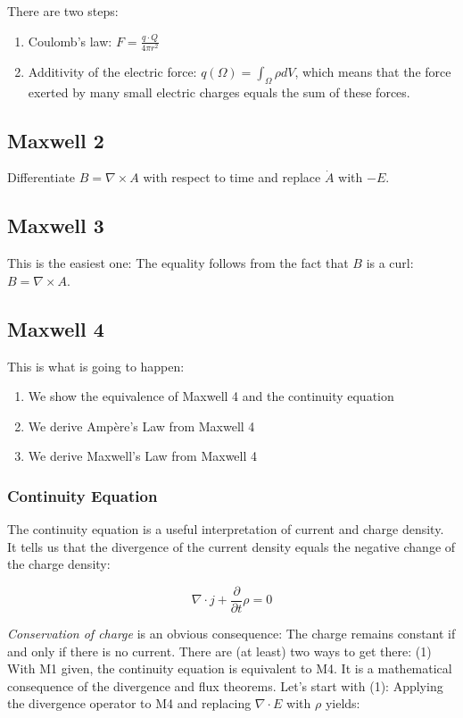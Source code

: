 \documentclass{article}
\begin{document}
There are two steps:
\begin{enumerate}
    \item Coulomb's law: $F = \frac{q \cdot Q}{4\pi r^2}$
    \item Additivity of the electric force: $q(\Omega) = \int_{\Omega} \rho dV$, which means that the force exerted by many small electric charges equals the sum of these forces. 
\end{enumerate}

\subsection{Maxwell 2}

Differentiate $B = \nabla \times A$ with respect to time and replace $\dot A$ with $-E$.

\subsection{Maxwell 3}
This is the easiest one: The equality follows from the fact that $B$ is a curl: $B = \nabla \times A$.

\subsection{Maxwell 4}

This is what is going to happen:

\begin{enumerate}
    \item We show the equivalence of Maxwell 4 and the continuity equation
    \item We derive Ampère's Law from Maxwell 4
    \item We derive Maxwell's Law from Maxwell 4
\end{enumerate}

\subsubsection{Continuity Equation}
The continuity equation is a useful interpretation of current and charge density. It tells us that the divergence of the current density equals the negative change of the charge density: 

\begin{equation} \label{continuity}
\nabla \cdot j + \frac{\partial}{\partial t} \rho = 0
\end{equation}

\emph{Conservation of charge} is an obvious consequence: The charge remains constant if and only if there is no current. There are (at least) two ways to get there: (1) With M1 given, the continuity equation is equivalent to M4. It is a mathematical consequence of the divergence and flux theorems. Let's start with (1): Applying the divergence operator to M4 and replacing $\nabla \cdot E$ with $\rho$ yields:
\end{document}
